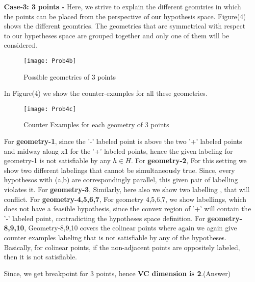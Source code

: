 \documentclass{article}
\begin{document}
   \textbf {Case-3: 3 points -} Here, we strive to explain the different geomtries in which the points can be placed from the perspective of our hypothesis space. Figure(4) shows the different geomtries. The geometries that are symmetrical with respect to our hypetheses space are grouped together and only one of them will be considered. \newline
  \begin{figure}[h!]
   \centering
  \texttt{[image: Prob4b]}
  \caption{Possible geometries of 3 points}
  \end{figure}

  In Figure(4) we show the counter-examples for all these geometries. \newline
  \begin{figure}[h!]
   \centering
  \texttt{[image: Prob4c]}
  \caption{Counter Examples for each geometry of 3 points}
  \end{figure}
  For \textbf {geometry-1}, since the '-' labeled point is above the two '+' labeled points and midway along x1 for the '+' labeled points, hence the given labeling for geometry-1 is not satisfiable by any $h \in H$. \newline
  For \textbf {geometry-2}, For this setting we show two different labelings that cannot be simultaneously true. Since, every hypothesos with (a,b) are correspondingly parallel, this given pair of labelling violates it. \newline
  For \textbf {geometry-3}, Similarly, here also we show two labelling , that will conflict. \newline
  For \textbf {geometry-4,5,6,7}, For geometry 4,5,6,7, we show labellings, which does not have a feasible hypothesis, since the convex region of '+' will contain the '-' labeled point, contradicting the hypotheses space definition. \newline
  For \textbf {geometry-8,9,10}, Geometry-8,9,10 covers the colinear points where again we again give counter examples labeling that is not satisfiable by any of the hypotheses. Basically, for colinear points, if the non-adjacent points are oppositely labeled, then it is not satisfiable. \newline

  Since, we get breakpoint for 3 points, hence \textbf {VC dimension is 2}.(Answer)\newline

  

  
  
	
    
    
\end{document}
